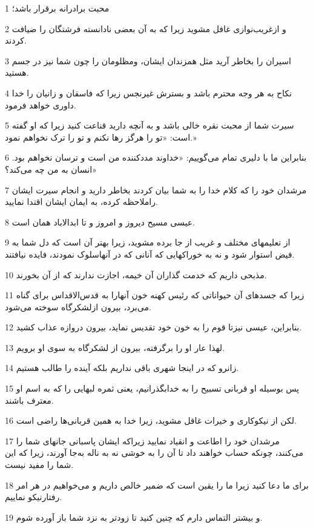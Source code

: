 \par 1 محبت برادرانه برقرار باشد؛
\par 2 و ازغریب‌نوازی غافل مشوید زیرا که به آن بعضی نادانسته فرشتگان را ضیافت کردند.
\par 3 اسیران را بخاطر آرید مثل همزندان ایشان، ومظلومان را چون شما نیز در جسم هستید.
\par 4 نکاح به هر وجه محترم باشد و بسترش غیرنجس زیرا که فاسقان و زانیان را خدا داوری خواهد فرمود.
\par 5 سیرت شما از محبت نقره خالی باشد و به آنچه دارید قناعت کنید زیرا که او گفته است: «تو را هرگز رها نکنم و تو را ترک نخواهم نمود.»
\par 6 بنابراین ما با دلیری تمام می‌گوییم: «خداوند مددکننده من است و ترسان نخواهم بود. انسان به من چه می‌کند؟»
\par 7 مرشدان خود را که کلام خدا را به شما بیان کردند بخاطر دارید و انجام سیرت ایشان راملاحظه کرده، به ایمان ایشان اقتدا نمایید.
\par 8 عیسی مسیح دیروز و امروز و تا ابدالاباد همان است.
\par 9 از تعلیمهای مختلف و غریب از جا برده مشوید، زیرا بهتر آن است که دل شما به فیض استوار شود و نه به خوراکهایی که آنانی که در آنهاسلوک نمودند، فایده نیافتند.
\par 10 مذبحی داریم که خدمت گذاران آن خیمه، اجازت ندارند که از آن بخورند.
\par 11 زیرا که جسدهای آن حیواناتی که رئیس کهنه خون آنهارا به قدس‌الاقداس برای گناه می‌برد، بیرون ازلشکرگاه سوخته می‌شود.
\par 12 بنابراین، عیسی نیزتا قوم را به خون خود تقدیس نماید، بیرون دروازه عذاب کشید.
\par 13 لهذا عار او را برگرفته، بیرون از لشکرگاه به سوی او برویم.
\par 14 زانرو که در اینجا شهری باقی نداریم بلکه آینده را طالب هستیم.
\par 15 پس بوسیله او قربانی تسبیح را به خدابگذرانیم، یعنی ثمره لبهایی را که به اسم او معترف باشند.
\par 16 لکن از نیکوکاری و خیرات غافل مشوید، زیرا خدا به همین قربانی‌ها راضی است.
\par 17 مرشدان خود را اطاعت و انقیاد نمایید زیراکه ایشان پاسبانی جانهای شما را می‌کنند، چونکه حساب خواهند داد تا آن را به خوشی نه به ناله به‌جا آورند، زیرا که این شما را مفید نیست.
\par 18 برای ما دعا کنید زیرا ما را یقین است که ضمیر خالص داریم و می‌خواهیم در هر امر رفتارنیکو نماییم.
\par 19 و بیشتر التماس دارم که چنین کنید تا زودتر به نزد شما باز آورده شوم.
